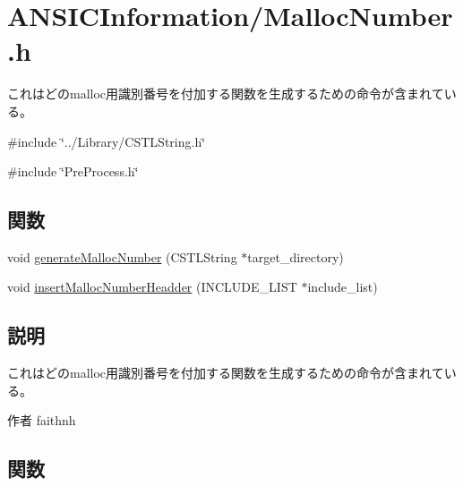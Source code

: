 \section{ANSICInformation/MallocNumber.h}
\label{MallocNumber_8h}


これはどのmalloc用識別番号を付加する関数を生成するための命令が含まれている。  


{\ttfamily \#include \char`\"{}../Library/CSTLString.h\char`\"{}}\par
{\ttfamily \#include \char`\"{}PreProcess.h\char`\"{}}\par
\subsection*{関数}
\begin{DoxyCompactItemize}
\item 
void \hyperlink{MallocNumber_8h_a6a7ea0f1f8ad3055f1fd66b58a66635e}{generateMallocNumber} (CSTLString $\ast$target\_\-directory)
\item 
void \hyperlink{MallocNumber_8h_a898f92bb8363e245cb26af5855213035}{insertMallocNumberHeadder} (INCLUDE\_\-LIST $\ast$include\_\-list)
\end{DoxyCompactItemize}


\subsection{説明}
これはどのmalloc用識別番号を付加する関数を生成するための命令が含まれている。 \begin{DoxyAuthor}{作者}
faithnh 
\end{DoxyAuthor}


\subsection{関数}
